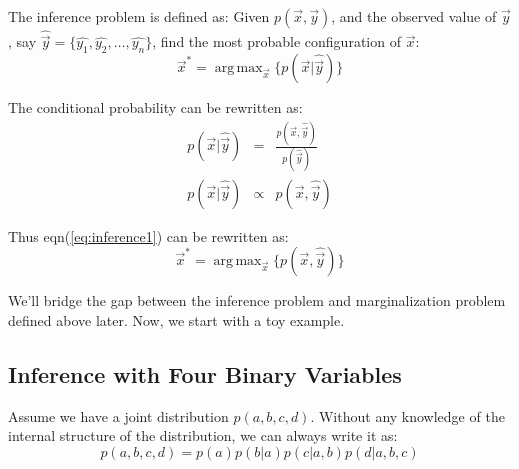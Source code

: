 \documentclass[11pt,a4paper]{article}
\DeclareMathOperator*{\argmax}{arg\,max}
\begin{document}

The inference problem is defined as: Given $p(\vec{x},\vec{y})$, 
and the observed value of $\vec{y}$, say 
$\hat{\vec{y}}=\{\hat{y_1},\hat{y_2},\ldots, \hat{y_n}\}$, 
find the most probable configuration of $\vec{x}$:
\begin{equation}
	\vec{x}^* = \argmax_{\vec{x}} \{ p(\vec{x}|\hat{\vec{y}}) \}
	\label{eq:inference1}
\end{equation}

The conditional probability can be rewritten as:
\begin{eqnarray}
p(\vec{x}|\hat{\vec{y}}) &=& \frac{p(\vec{x},\hat{\vec{y}})}{p(\hat{\vec{y}})} \\
p(\vec{x}|\hat{\vec{y}}) &\propto & p(\vec{x},\hat{\vec{y}})
\end{eqnarray}

Thus eqn(\ref{eq:inference1}) can be rewritten as:
\begin{equation}
	\vec{x}^* = \argmax_{\vec{x}} \{ p(\vec{x},\hat{\vec{y}}) \}
	\label{eq:inference2}
\end{equation}


We'll bridge the gap between the inference problem and marginalization problem 
defined above later. Now, we start with a toy example. 

\subsection{Inference with Four Binary Variables}

Assume we have a joint distribution $p(a,b,c,d)$. 
Without any knowledge of the internal structure of the distribution, 
we can always write it as:
\begin{equation}
	p(a,b,c,d) = p(a)p(b|a)p(c|a,b)p(d|a,b,c)
\end{equation}
\end{document}
